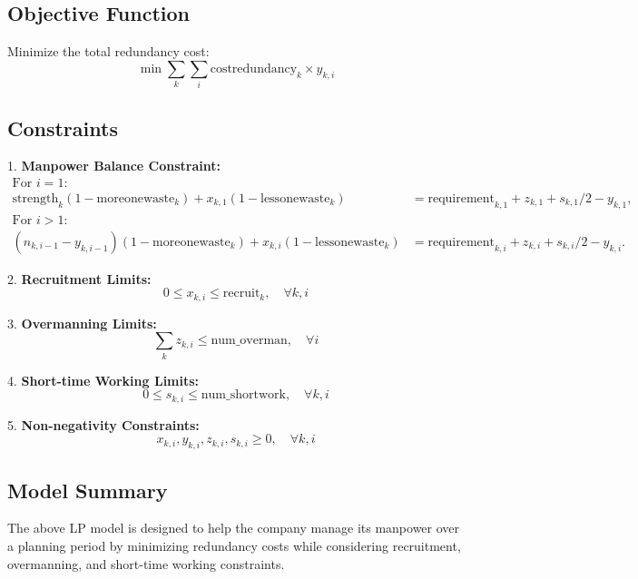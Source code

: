 \documentclass{article}
\begin{document}
\subsection*{Objective Function}
Minimize the total redundancy cost:
\begin{equation}
\min \sum_{k} \sum_{i} \text{costredundancy}_k \times y_{k,i}
\end{equation}

\subsection*{Constraints}
1. \textbf{Manpower Balance Constraint:}
   \begin{align*}
   \text{For } i = 1: & \\
   \text{strength}_k (1 - \text{moreonewaste}_k) + x_{k,1} (1 - \text{lessonewaste}_k) & = \text{requirement}_{k,1} + z_{k,1} + s_{k,1}/2 - y_{k,1}, \\
   \text{For } i > 1: & \\
   (n_{k,i-1} - y_{k,i-1}) (1 - \text{moreonewaste}_k) + x_{k,i} (1 - \text{lessonewaste}_k) & = \text{requirement}_{k,i} + z_{k,i} + s_{k,i}/2 - y_{k,i}.
   \end{align*}

2. \textbf{Recruitment Limits:}
   \begin{equation}
   0 \leq x_{k,i} \leq \text{recruit}_k, \quad \forall k, i
   \end{equation}

3. \textbf{Overmanning Limits:}
   \begin{equation}
   \sum_{k} z_{k,i} \leq \text{num\_overman}, \quad \forall i 
   \end{equation}

4. \textbf{Short-time Working Limits:}
   \begin{equation}
   0 \leq s_{k,i} \leq \text{num\_shortwork}, \quad \forall k, i
   \end{equation}

5. \textbf{Non-negativity Constraints:}
   \begin{equation}
   x_{k,i}, y_{k,i}, z_{k,i}, s_{k,i} \geq 0, \quad \forall k, i 
   \end{equation}

\subsection*{Model Summary}
The above LP model is designed to help the company manage its manpower over a planning period by minimizing redundancy costs while considering recruitment, overmanning, and short-time working constraints.
\end{document}
